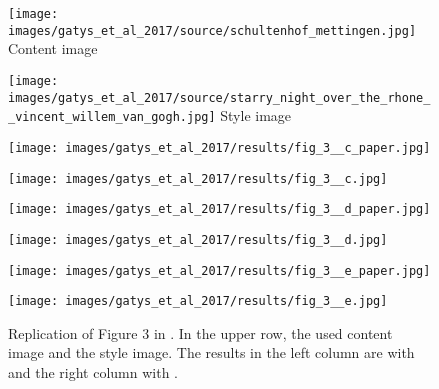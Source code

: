 \begin{figure}[H]
	\centering
	\begin{minipage}[t]{0.45\textwidth}
		\centering
		\texttt{[image: images/gatys\_et\_al\_2017/source/schultenhof\_mettingen.jpg]}
		Content image
	\end{minipage}
	\hfill%
	\begin{minipage}[t]{0.45\textwidth}
		\centering
		\texttt{[image: images/gatys\_et\_al\_2017/source/starry\_night\_over\_the\_rhone\_\_vincent\_willem\_van\_gogh.jpg]}
		Style image
	\end{minipage}
\hfill%
	\begin{minipage}[t]{0.45\textwidth}
		\centering
		\texttt{[image: images/gatys\_et\_al\_2017/results/fig\_3\_\_c\_paper.jpg]}
	\end{minipage}
	\hfill%
	\begin{minipage}[t]{0.45\textwidth}
		\centering
		\texttt{[image: images/gatys\_et\_al\_2017/results/fig\_3\_\_c.jpg]} 
	\end{minipage}
	\hfill%
	\begin{minipage}[t]{0.45\textwidth}
		\centering
		\texttt{[image: images/gatys\_et\_al\_2017/results/fig\_3\_\_d\_paper.jpg]} 
	\end{minipage}
	\hfill%
	\begin{minipage}[t]{0.45\textwidth}
		\centering
		\texttt{[image: images/gatys\_et\_al\_2017/results/fig\_3\_\_d.jpg]}
	\end{minipage}
	\hfill%
	\begin{minipage}[t]{0.45\textwidth}
		\centering
		\texttt{[image: images/gatys\_et\_al\_2017/results/fig\_3\_\_e\_paper.jpg]} 
	\end{minipage}
	\hfill%
	\begin{minipage}[t]{0.45\textwidth}
		\centering
		\texttt{[image: images/gatys\_et\_al\_2017/results/fig\_3\_\_e.jpg]}
	\end{minipage}
	\hfill%
\begin{minipage}[t]{0.45\textwidth}
	\centering
	\paper{}
\end{minipage}
\hfill%
\begin{minipage}[t]{0.45\textwidth}
	\centering
	\implementation{}
\end{minipage}
	\caption{Replication of Figure 3 in  \cite{GEB+2017}. In the upper row, the used content image and the style image. The results in the left column are with \paper{} and the right column with \implementation{}.}
	\label{fig:GEB+2017_fig3}
\end{figure}


